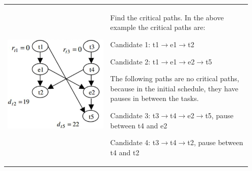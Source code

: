 		\begin{longtable}{p{0.4\linewidth}p{0.55\linewidth}}
			\includegraphics[scale=0.75]{./pictures/voltage_scheduling_bindings.png}
			&
				\vspace{-100pt}\begin{compactenum}
					\item Find the critical paths. In the above example the critical paths are:
					\begin{compactitem}
						\item Candidate 1: t1$\rightarrow$e1$\rightarrow$t2
						\item Candidate 2: t1$\rightarrow$e1$\rightarrow$e2$\rightarrow$t5
					\end{compactitem}
					The following paths are no critical paths, because in the initial schedule, they have pauses in between the tasks. 
					\begin{compactitem}
						\item Candidate 3: t3$\rightarrow$t4$\rightarrow$e2$\rightarrow$t5, pause between t4 and e2
						\item Candidate 4: t3$\rightarrow$t4$\rightarrow$t2, pause between t4 and t2
					\end{compactitem} 
				\end{compactenum}\\
			

\end{longtable}
